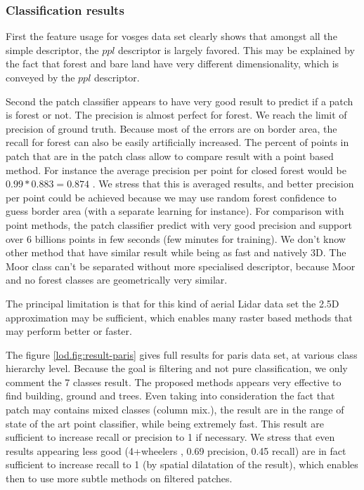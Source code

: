 	\subsubsection{Classification results}
		  First the feature usage for vosges data set clearly shows that amongst all the simple descriptor, the $ppl$ descriptor is largely favored.
		  This may be explained by the fact that forest and bare land have very different dimensionality, which is conveyed by the $ppl$ descriptor.
		  
		  Second the patch classifier appears to have very good result to predict if a patch is forest or not. The precision is almost perfect for forest. We reach the limit of precision of ground truth.
		  Because most of the errors are on border area, the recall for forest can also be easily artificially increased. The percent of points in patch that are in the patch class allow to compare result with a point based method. 
		  For instance the average precision per point for closed forest would be $0.99*0.883=0.874$ . We stress that this is averaged results, and better precision per point could be achieved because we may use random forest confidence to guess border area (with a separate learning for instance).
		  For comparison with point methods, the patch classifier predict with very good precision and support over 6 billions points in few seconds (few minutes for training). We don't know other method that have similar result while being as fast and natively 3D.
		   The Moor class can't be separated without more specialised descriptor, because Moor and no forest classes are geometrically very similar.
		  
		  The principal limitation is that for this kind of aerial Lidar data set the 2.5D approximation may be sufficient, which enables many raster based methods that may perform better or faster.
		  
		  The figure \ref{lod.fig:result-paris} gives full results for paris data set, at various class hierarchy level.
		  Because the goal is filtering and not pure classification, we only comment the 7 classes result. The proposed methods appears very effective to find building, ground and trees.
		  Even taking into consideration the fact that patch may contains mixed classes (column mix.), the result are in the range of state of the art point classifier, while being extremely fast. 
		  This result are sufficient to increase recall or precision to 1 if necessary.
		  We stress that even results appearing less good (4+wheelers , 0.69 precision, 0.45 recall) are in fact sufficient to increase recall to 1 (by spatial dilatation of the result), which enables then to use more subtle methods on filtered patches.
		  
